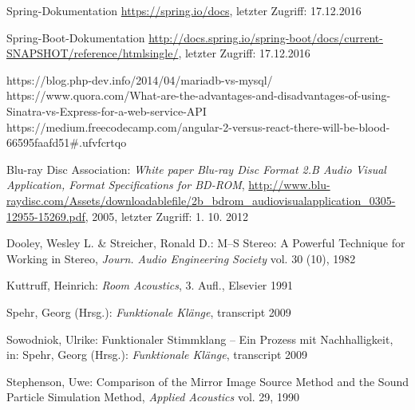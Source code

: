 \listoffigures
\begin{thebibliography}{}


Spring-Dokumentation
\url{https://spring.io/docs}, letzter Zugriff: 17.12.2016

Spring-Boot-Dokumentation
\url{http://docs.spring.io/spring-boot/docs/current-SNAPSHOT/reference/htmlsingle/}, letzter Zugriff: 17.12.2016

https://blog.php-dev.info/2014/04/mariadb-vs-mysql/
https://www.quora.com/What-are-the-advantages-and-disadvantages-of-using-Sinatra-vs-Express-for-a-web-service-API
https://medium.freecodecamp.com/angular-2-versus-react-there-will-be-blood-66595faafd51#.ufvfcrtqo


Blu-ray Disc Association: 
\emph{White paper Blu-ray Disc Format 2.B Audio Visual Application, Format Specifications for BD-ROM}, 
\url{http://www.blu-raydisc.com/Assets/downloadablefile/2b_bdrom_audiovisualapplication_0305-12955-15269.pdf}, 2005, letzter Zugriff: 1. 10. 2012




Dooley, Wesley L.  \& Streicher, Ronald D.:
\glqq M--S Stereo: A Powerful Technique for Working in Stereo\grqq, 
\emph{Journ. Audio Engineering Society} vol. 30 (10), 1982

Kuttruff, Heinrich: 
\emph{Room Acoustics}, 3. Aufl., Elsevier 1991

Spehr, Georg (Hrsg.): 
\emph{Funktionale Klänge}, transcript 2009

Sowodniok, Ulrike: 
\glqq Funktionaler Stimmklang -- Ein Prozess mit Nachhalligkeit\grqq, 
in: Spehr, Georg (Hrsg.): \emph{Funktionale Klänge}, transcript 2009

Stephenson, Uwe: 
\glqq Comparison of the Mirror Image Source Method and the Sound Particle Simulation Method\grqq, 
\emph{Applied Acoustics} vol. 29, 1990


\end{thebibliography}

\clearpage\thispagestyle{empty}
\eigen  %












